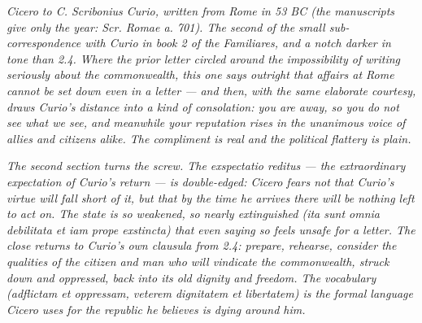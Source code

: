 
\textit{Cicero to C. Scribonius Curio, written from Rome in 53
BC (the manuscripts give only the year: \textit{Scr. Romae
a. 701}). The second of the small sub-correspondence with
Curio in book 2 of the \textit{Familiares}, and a notch
darker in tone than 2.4. Where the prior letter circled around
the impossibility of writing seriously about the commonwealth,
this one says outright that affairs at Rome cannot be set down
even in a letter --- and then, with the same elaborate
courtesy, draws Curio's distance into a kind of consolation:
you are away, so you do not see what we see, and meanwhile your
reputation rises in the unanimous voice of allies and citizens
alike. The compliment is real and the political flattery is
plain.}

\textit{The second section turns the screw. The
\textit{exspectatio reditus} --- the extraordinary expectation
of Curio's return --- is double-edged: Cicero fears not that
Curio's virtue will fall short of it, but that by the time
he arrives there will be nothing left to act on. The
state is so weakened, so nearly extinguished
(\textit{ita sunt omnia debilitata et iam prope exstincta})
that even saying so feels unsafe for a letter. The close
returns to Curio's own \textit{clausula} from 2.4: prepare,
rehearse, consider the qualities of the citizen and man who
will vindicate the commonwealth, struck down and oppressed,
back into its old dignity and freedom. The vocabulary
(\textit{adflictam et oppressam}, \textit{veterem dignitatem
et libertatem}) is the formal language Cicero uses for the
republic he believes is dying around him.}
